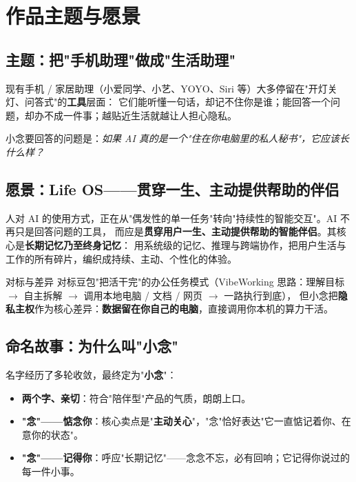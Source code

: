 \begin{center}
\end{center}


\chapter{作品主题与愿景}

\section{主题：把"手机助理"做成"生活助理"}
现有手机 / 家居助理（小爱同学、小艺、YOYO、Siri 等）大多停留在"开灯关灯、问答式"的\textbf{工具}层面：
它们能听懂一句话，却记不住你是谁；能回答一个问题，却办不成一件事；越贴近生活就越让人担心隐私。

小念要回答的问题是：\emph{如果 AI 真的是一个"住在你电脑里的私人秘书"，它应该长什么样？}

\section{愿景：Life OS——贯穿一生、主动提供帮助的伴侣}
人对 AI 的使用方式，正在从"偶发性的单一任务"转向"持续性的智能交互"。AI 不再只是回答问题的工具，
而应是\textbf{贯穿用户一生、主动提供帮助的智能伴侣}。其核心是\textbf{长期记忆乃至终身记忆}：
用系统级的记忆、推理与跨端协作，把用户生活与工作的所有碎片，编织成持续、主动、个性化的体验。

\begin{keybox}{对标与差异}
对标豆包"把活干完"的办公任务模式（VibeWorking 思路：理解目标 $\to$ 自主拆解 $\to$ 调用本地电脑 / 文档 / 网页 $\to$ 一路执行到底），
但小念把\textbf{隐私主权}作为核心差异：\textbf{数据留在你自己的电脑}，直接调用你本机的算力干活。
\end{keybox}

\section{命名故事：为什么叫"小念"}
名字经历了多轮收敛，最终定为"\textbf{小念}"：
\begin{itemize}[leftmargin=1.4em]
  \item \textbf{两个字、亲切}：符合"陪伴型"产品的气质，朗朗上口。
  \item \textbf{"念"——惦念你}：核心卖点是"\textbf{主动关心}"，"念"恰好表达"它一直惦记着你、在意你的状态"。
  \item \textbf{"念"——记得你}：呼应"长期记忆"——念念不忘，必有回响；它记得你说过的每一件小事。
\end{itemize}

